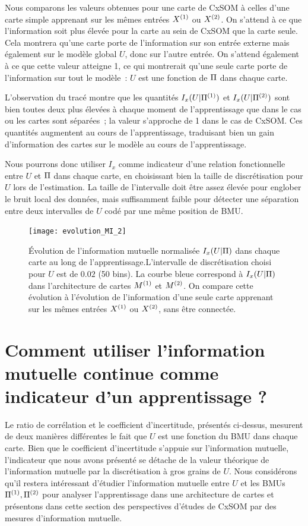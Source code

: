 \documentclass[../main]{subfiles}
\begin{document}
Nous comparons les valeurs obtenues pour une carte de CxSOM à celles d'une carte simple apprenant sur les mêmes entrées $X^{({1})}$ ou $X^{({2})}$.
On s'attend à ce que l'information soit plus élevée pour la carte au sein de CxSOM que la carte seule. Cela montrera qu'une carte porte de l'information sur son entrée externe mais également sur le modèle global $U$, donc sur l'autre entrée.
On s'attend également à ce que cette valeur atteigne 1, ce qui montrerait qu'une seule carte porte de l'information sur tout le modèle~: $U$ est une fonction de $\Pi$ dans chaque carte.

L'observation du tracé montre que les quantités $I_x(U|\Pi^{({1})})$ et $I_x(U|\Pi^{({2})})$ sont bien toutes deux plus élevées à chaque moment de l'apprentissage que dans le cas ou les cartes sont séparées~; la valeur s'approche de 1 dans le cas de CxSOM.
Ces quantités augmentent au cours de l'apprentissage, traduisant bien un gain d'information des cartes sur le modèle au cours de l'apprentissage.

Nous pourrons donc utiliser $I_x$ comme indicateur d'une relation fonctionnelle entre $U$ et $\Pi$ dans chaque carte, en choisissant bien la taille de discrétisation pour $U$ lors de l'estimation. La taille de l'intervalle doit être assez élevée pour englober le bruit local des données, mais suffisamment faible pour détecter une séparation entre deux intervalles de $U$ codé par une même position de BMU.

\begin{figure}
\centering\texttt{[image: evolution\_MI\_2]}
\caption{\'Evolution de l'information mutuelle normalisée $I_x(U|\Pi)$ dans chaque carte au long de l'apprentissage.L'intervalle de discrétisation choisi pour $U$ est de $0.02$ (50 bins).
La courbe bleue correspond à $I_x(U|\Pi)$ dans l'architecture de cartes $M^{({1})}$ et $M^{({2})}$. On compare cette évolution à l'évolution de l'information d'une seule carte apprenant sur les mêmes entrées $X^{({1})}$ ou $X^{({2})}$, sans être connectée.}
\label{fig:MI_evol}
\end{figure}

\section{Comment utiliser l'information mutuelle continue comme indicateur d'un apprentissage ?}

Le ratio de corrélation et le coefficient d'incertitude, présentés ci-dessus, mesurent de deux manières différentes le fait que $U$ est une fonction du BMU dans chaque carte.
Bien que le coefficient d'incertitude s'appuie sur l'information mutuelle, l'indicateur que nous avons présenté se détache de la valeur théorique de l'information mutuelle par la discrétisation à gros grains de $U$.
Nous considérons qu'il restera intéressant d'étudier l'information mutuelle entre $U$ et les BMUs $\Pi^{({1})}, \Pi^{({2})}$ pour analyser l'apprentissage dans une architecture de cartes et présentons dans cette section des perspectives d'études de CxSOM par des mesures d'information mutuelle.
\end{document}

